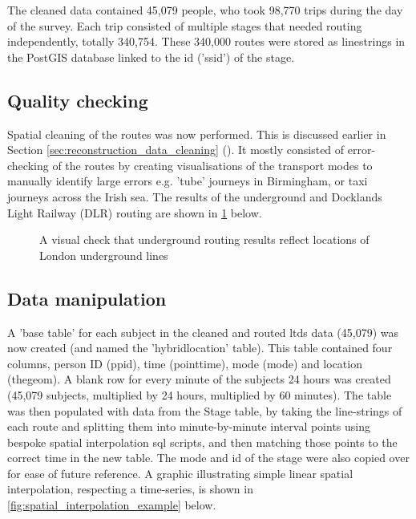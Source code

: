 The cleaned data contained 45,079 people, who took 98,770 trips during the day of the survey. Each trip consisted of multiple stages that needed routing independently, totally 340,754. These 340,000 routes were stored as linestrings in the PostGIS database linked to the id ('ssid') of the stage.

\subsection{Quality checking}
\label{sec:reconstruction_quality_checking}

Spatial cleaning of the routes was now performed. This is discussed earlier in Section \ref{sec:reconstruction_data_cleaning} (). It mostly consisted of error-checking of the routes by creating visualisations of the transport modes to manually identify large errors e.g. 'tube' journeys in Birmingham, or taxi journeys across the Irish sea. The results of the underground and Docklands Light Railway (DLR) routing are shown in \ref{fig:underground_routing} below.

\begin{landscape}

\begin{figure}[H]
\centering
{}
\caption{A visual check that underground routing results reflect locations of London underground lines}
\label{fig:underground_routing}
\end{figure}

\end{landscape}

\subsection{Data manipulation}
\label{sec:reconstruction_data_manipulation}

A 'base table' for each subject in the cleaned and routed \gls{ltds} data (45,079) was now created (and named the 'hybrid\textunderscore location' table). This table contained four columns, person ID (ppid), time (pointtime), mode (mode) and location (thegeom). A blank row for every minute of the subjects 24 hours was created (45,079 subjects, multiplied by 24 hours, multiplied by 60 minutes). The table was then populated with data from the Stage table, by taking the line-strings of each route and splitting them into minute-by-minute interval points using bespoke spatial interpolation \gls{sql} scripts, and then matching those points to the correct time in the new table. The mode and id of the stage were also copied over for ease of future reference. A graphic illustrating simple linear spatial interpolation, respecting a time-series, is shown in \ref{fig:spatial_interpolation_example} below.

